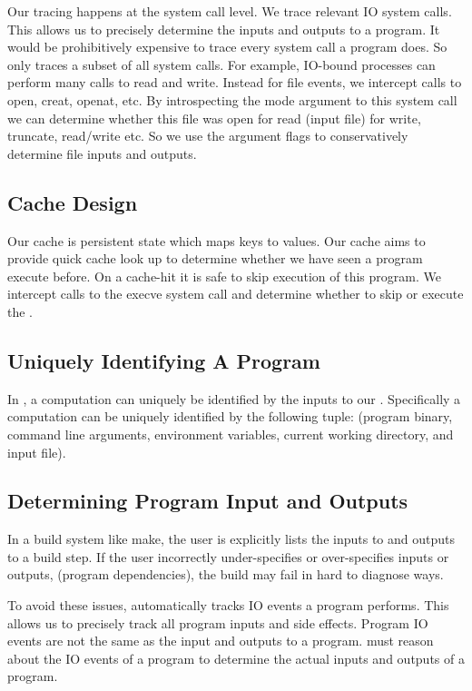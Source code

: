 Our tracing happens at the system call level. We trace relevant IO system calls. This allows us to precisely determine the inputs and outputs to a program. It would be prohibitively expensive to trace every system call a program does. So \pc only traces a subset of all system calls. For example, IO-bound processes can perform many calls to read and write. Instead for file events, we intercept calls to open, creat, openat, etc. By introspecting the mode argument to this system call we can determine whether this file was open for read (input file) for write, truncate, read/write etc. So we use the argument flags to conservatively determine file inputs and outputs.

\subsection{Cache Design}
Our cache is persistent state which maps keys to values. Our cache aims to provide quick cache look up to determine whether we have seen a program execute before.
On a cache-hit it is safe to skip execution of this program. We intercept calls to the execve system call and determine whether to skip or execute the \cacheunit. 

\subsection{Uniquely Identifying A Program}
In \pc, a computation can uniquely be identified by the inputs to our \cacheunit. Specifically a computation can be uniquely identified by the following tuple: (program binary, command line arguments, environment variables, current working directory, and input file).


\subsection{Determining Program Input and Outputs}
In a build system like make, the user is explicitly lists the inputs to and outputs to a build step. If the user
incorrectly under-specifies or over-specifies inputs or outputs, (program dependencies), the build may fail in hard to diagnose ways.

To avoid these issues, \pc automatically tracks IO events a program performs. This allows us to precisely track all program inputs and side effects. Program IO events are not the same as the input and outputs to a program. \pc must reason about the IO events of a program to determine the actual inputs and outputs of a program.


